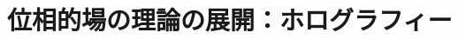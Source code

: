 \documentclass[TQFT_main]{subfiles}
\begin{document}
\setcounter{chapter}{3}

\chapter{位相的場の理論の展開：ホログラフィー}
\end{document}
